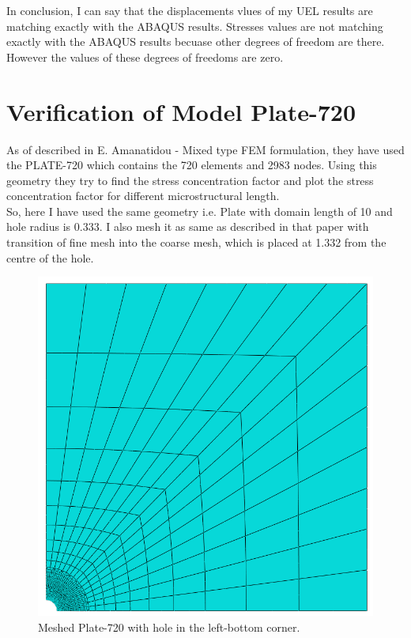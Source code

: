 \documentclass[12pt]{article}
\begin{document}
In conclusion, I can say that the displacements vlues of my UEL results are matching exactly with the ABAQUS results. Stresses values are not matching exactly with the ABAQUS results becuase other degrees of freedom are there. However the values of these degrees of freedoms are zero.
\newpage
\section{Verification of Model Plate-720}
As of described in E. Amanatidou - Mixed type FEM formulation, they have used the PLATE-720 which contains the 720 elements and 2983 nodes. Using this geometry they try to find the stress concentration factor and plot the stress concentration factor for different microstructural length.
\\
So, here I have used the same geometry i.e. Plate with domain length of 10 and hole radius is 0.333. I also mesh it as same as described in that paper with transition of fine mesh into the coarse mesh, which is placed at 1.332 from the centre of the hole.   
\begin{figure}[H]
	\begin{center}
		\includegraphics[scale=0.35]{mesh_part.png} 
	\end{center}  
   \caption{Meshed Plate-720 with hole in the left-bottom corner.}
\end{figure}
\end{document}

